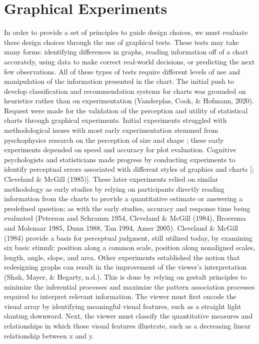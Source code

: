 \documentclass[print]{nuthesis}
\begin{document}
\hypertarget{graphical-experiments}{%
\section{Graphical Experiments}\label{graphical-experiments}}

In order to provide a set of principles to guide design choices, we must evaluate these design choices through
the use of graphical tests. These tests may take many forms: identifying differences in graphs, reading information
off of a chart accurately, using data to make correct real-world decisions, or predicting the next few observations.
All of these types of tests require different levels of use and manipulation of the information presented in the chart.
The initial push to develop classification and recommendation systems for charts was grounded on heuristics rather than on experimentation (Vanderplas, Cook, \& Hofmann, 2020).
Request were made for the validation of the perception and utility of statistical charts through graphical experiments.
Initial experiments struggled with methodological issues  with most early experimentation stemmed from pyschophysics research on the perception of size and shape ; these early experiments depended on speed and accuracy for plot evaluation.
Cognitive psychologists and statisticians made progress by conducting experiments to identify perceptual errors associated with different styles of graphics and charts {[}; Cleveland \& McGill (1985){]}.
These later experiments relied on similar methodology as early studies by relying on participants directly reading information from the charts to provide a quantitative estimate or answering a predefined question; as with the early studies, accuracy and response time being evaluated (Peterson and Schramm 1954, Cleveland \& McGill (1984), Broersma and Molenaar 1985, Dunn 1988, Tan 1994, Amer 2005).
Cleveland \& McGill (1984) provide a basis for perceptual judgment, still utilized today, by examining six basic stimuli: position along a common scale, position along nonaligned scales, length, angle, slope, and area.
Other experiments established the notion that redesigning graphs can result in the improvement of the viewer's interpretation (Shah, Mayer, \& Hegarty, n.d.). This is done by relying on gestalt principles to minimize the inferential processes and maximize the pattern association processes required to interpret relevant information. The viewer must first encode the visual array by identifying meaningful visual features, such as a straight light slanting downward. Next, the viewer must classify the quantitative measures and relationships in which those visual features illustrate, such as a decreasing linear relationship between x and y.
\end{document}
